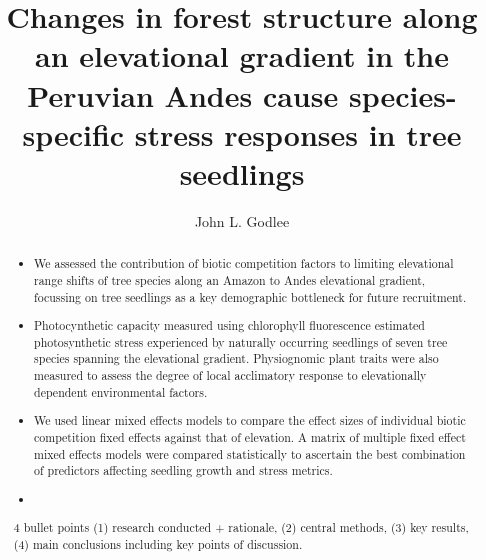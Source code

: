 \documentclass[a4paper, 11pt]{article}
\title{Changes in forest structure along an elevational gradient in the Peruvian Andes cause species-specific stress responses in tree seedlings}
\author{John L. Godlee}
\begin{document}

\maketitle{}

\begin{abstract}
\noindent

\begin{itemize}
\item{We assessed the contribution of biotic competition factors to limiting elevational range shifts of tree species along an Amazon to Andes elevational gradient, focussing on tree seedlings as a key demographic bottleneck for future recruitment.}
\item{Photocynthetic capacity measured using chlorophyll fluorescence estimated photosynthetic stress experienced by naturally occurring seedlings of seven tree species spanning the elevational gradient. Physiognomic plant traits were also measured to assess the degree of local acclimatory response to elevationally dependent environmental factors.}
\item{We used linear mixed effects models to compare the effect sizes of individual biotic competition fixed effects against that of elevation. A matrix of multiple fixed effect mixed effects models were compared statistically to ascertain the best combination of predictors affecting seedling growth and stress metrics.}
\item{}
\end{itemize}

4 bullet points (1) research conducted + rationale, (2) central methods, (3) key results, (4) main conclusions including key points of discussion. 
	
\end{abstract}
\end{document}

